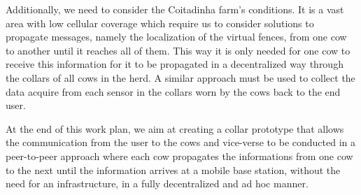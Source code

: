 Additionally, we need to consider the Coitadinha farm's conditions. It is a vast area with
low cellular coverage which require us to consider solutions to propagate messages, namely
the localization of the virtual fences, from one cow to another until it reaches all of them.
This way it is only needed for one cow to receive this information for it to be propagated in
a decentralized way through the collars of all cows in the herd.
A similar approach must be used to collect the data acquire from each sensor
in the collars worn by the cows back to the end user.

At the end of this work plan, we aim at creating a collar prototype that allows the communication from the user to
the cows and vice-verse to be conducted in a peer-to-peer approach where each cow propagates
the informations from one cow to the next until the information arrives at a mobile base station,
without the need for an infrastructure, in a fully decentralized and ad hoc manner.

